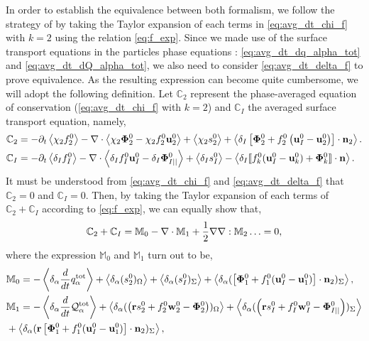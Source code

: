 In order to establish the equivalence between both formalism, we follow the strategy of \citep{lhuillier2000bilan,lhuillier2009rheology} by taking the Taylor expansion of each terms in \ref{eq:avg_dt_chi_f} with $k=2$ using the relation \ref{eq:f_exp}. 
Since we made use of the surface transport equations in the particles phase equations : \ref{eq:avg_dt_dq_alpha_tot} and \ref{eq:avg_dt_dQ_alpha_tot}, we also need to consider \ref{eq:avg_dt_delta_f}  to prove equivalence. 
As the resulting expression can become quite cumbersome, we will adopt the following definition. 
Let $\mathbb{C}_2$ represent the phase-averaged equation of conservation (\ref{eq:avg_dt_chi_f} with $k=2$) and $\mathbb{C}_I$ the averaged surface transport equation, namely, 
\begin{align*}
    \mathbb{C}_2
    &=
    - \partial_t \left<\chi_2f_2^0\right>
    - \mathbf{\nabla}\cdot \left<\chi_2 \mathbf{\Phi}_2^0 - \chi_2f_2^0 \textbf{u}_2^0\right>
    + \left<\chi_2 s_2^0\right>
    + \left<\delta_I\left[
        \mathbf{\Phi}_2^0
        + f_2^0
        \left(
            \textbf{u}_I^0
            - \textbf{u}_2^0
        \right)
    \right]
    \cdot \textbf{n}_2\right>.\\
    \mathbb{C}_I
    &= 
    -\partial_t \left<\delta_If_I^0\right>
    -\mathbf{\nabla}\cdot \left<\delta_I f_I^0 \textbf{u}_I^0-\delta_I \mathbf{\Phi}_{I||}^0 \right>
    + \left<\delta_Is_I^0\right> 
    - \left<\delta_I \llbracket 
    f_k^0 (\textbf{u}_I^0 - \textbf{u}_k^0)
    + \mathbf{\Phi}_k^0
     \rrbracket \cdot \textbf{n} \right>. 
\end{align*}
It must be understood from \ref{eq:avg_dt_chi_f} and \ref{eq:avg_dt_delta_f} that $\mathbb{C}_2=0$ and $\mathbb{C}_I=0$.
Then, by taking the Taylor expansion of each terms of $\mathbb{C}_2+\mathbb{C}_I$ according to \ref{eq:f_exp}, we can equally show that,
\begin{equation}
    \mathbb{C}_2 
    + \mathbb{C}_I 
    = \mathbb{M}_0 - \mathbf{\nabla}\cdot \mathbb{M}_1 + \frac{1}{2} \mathbf{\nabla}\mathbf{\nabla} : \mathbb{M}_2 \ldots = 0,
    \label{eq:scheme_equivalence}
\end{equation} 
where the expression $\mathbb{M}_0$ and $\mathbb{M}_1$ turn out to be, 
\begin{align*}
    &\mathbb{M}_0
    = 
    - \left<\delta_\alpha \frac{d}{d t} {q_\alpha^\text{tot}}\right>
    + \left<\delta_\alpha (  s_2^0  )_{\Omega}\right>
    + \left<\delta_\alpha (  s_I^0  )_{\Sigma}\right>
    + \left<\delta_\alpha (  
    \left[\mathbf{\Phi}_1^0 
    + f_1^0 (\textbf{u}_I^0-\textbf{u}_1^0) \right] \cdot \textbf{n}_2  )_{\Sigma}\right>,\\
    &\mathbb{M}_1 =
    -  \left<\delta_\alpha \frac{d}{d t} {\mathcal{Q}_\alpha^\text{tot}}\right>
     + \left<\delta_\alpha (  \left(
        \textbf{r} s_2^0         
        + f_2^0  \textbf{w}_2^0 
        - \mathbf{\Phi}_2^0
    \right)  )_{\Omega}\right>
    + \left<\delta_\alpha (  \left(
        \textbf{r}s_I^0
        + f_I^0 \textbf{w}_I^0
        - \mathbf{\Phi}_{I||}^0
    \right)  )_{\Sigma}\right>\\
    &+ \left<\delta_\alpha (  \textbf{r} \left[
        \mathbf{\Phi}_1^0
        + f_1^0 (\textbf{u}_I^0-\textbf{u}_1^0)
    \right]\cdot \textbf{n}_2   )_{\Sigma}\right>,
\end{align*}
